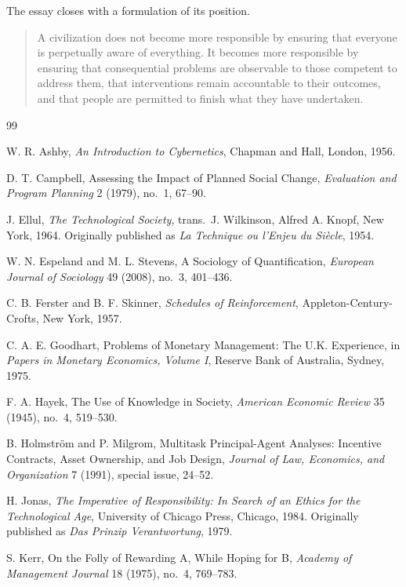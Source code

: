 \documentclass[11pt]{report}
\theoremstyle{definition}
\theoremstyle{remark}
\begin{document}
The essay closes with a formulation of its position.

\begin{quote}
A civilization does not become more responsible by ensuring that everyone is perpetually aware of everything. It becomes more responsible by ensuring that consequential problems are observable to those competent to address them, that interventions remain accountable to their outcomes, and that people are permitted to finish what they have undertaken.
\end{quote}

\begin{thebibliography}{99}

 W. R. Ashby, \textit{An Introduction to Cybernetics}, Chapman and Hall, London, 1956.

 D. T. Campbell, Assessing the Impact of Planned Social Change, \textit{Evaluation and Program Planning} 2 (1979), no.\ 1, 67--90.

 J. Ellul, \textit{The Technological Society}, trans.\ J. Wilkinson, Alfred A. Knopf, New York, 1964. Originally published as \textit{La Technique ou l'Enjeu du Si\`ecle}, 1954.

 W. N. Espeland and M. L. Stevens, A Sociology of Quantification, \textit{European Journal of Sociology} 49 (2008), no.\ 3, 401--436.

 C. B. Ferster and B. F. Skinner, \textit{Schedules of Reinforcement}, Appleton-Century-Crofts, New York, 1957.

 C. A. E. Goodhart, Problems of Monetary Management: The U.K. Experience, in \textit{Papers in Monetary Economics, Volume I}, Reserve Bank of Australia, Sydney, 1975.

 F. A. Hayek, The Use of Knowledge in Society, \textit{American Economic Review} 35 (1945), no.\ 4, 519--530.

 B. Holmstr\"om and P. Milgrom, Multitask Principal-Agent Analyses: Incentive Contracts, Asset Ownership, and Job Design, \textit{Journal of Law, Economics, and Organization} 7 (1991), special issue, 24--52.

 H. Jonas, \textit{The Imperative of Responsibility: In Search of an Ethics for the Technological Age}, University of Chicago Press, Chicago, 1984. Originally published as \textit{Das Prinzip Verantwortung}, 1979.

 S. Kerr, On the Folly of Rewarding A, While Hoping for B, \textit{Academy of Management Journal} 18 (1975), no.\ 4, 769--783.


\end{thebibliography}
\end{document}

